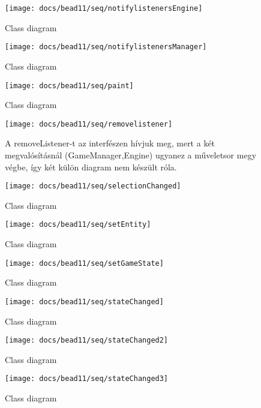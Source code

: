 \documentclass[../../projlab]{subfiles}
\begin{document}
\begin{figure}[H] 
    \centering 
    \texttt{[image: docs/bead11/seq/notifylistenersEngine]} 
    \caption{Class diagram} 
\end{figure} 

\begin{figure}[H] 
    \centering 
    \texttt{[image: docs/bead11/seq/notifylistenersManager]} 
    \caption{Class diagram} 
\end{figure} 

\begin{figure}[H] 
    \centering 
    \texttt{[image: docs/bead11/seq/paint]} 
    \caption{Class diagram} 
\end{figure} 

\begin{figure}[H] 
    \centering 
    \texttt{[image: docs/bead11/seq/removelistener]} 
    \caption{A removeListener-t az interfészen hívjuk meg, mert a két megvalósításnál (GameManager,Engine) ugyanez a műveletsor megy végbe, így két külön diagram nem készült róla.} 
\end{figure}

\begin{figure}[H] 
    \centering 
    \texttt{[image: docs/bead11/seq/selectionChanged]} 
    \caption{Class diagram} 
\end{figure}

\begin{figure}[H] 
    \centering 
    \texttt{[image: docs/bead11/seq/setEntity]} 
    \caption{Class diagram} 
\end{figure} 

\begin{figure}[H] 
    \centering 
    \texttt{[image: docs/bead11/seq/setGameState]} 
    \caption{Class diagram} 
\end{figure} 

\begin{figure}[H] 
    \centering 
    \texttt{[image: docs/bead11/seq/stateChanged]} 
    \caption{Class diagram} 
\end{figure}

\begin{figure}[H] 
    \centering 
    \texttt{[image: docs/bead11/seq/stateChanged2]} 
    \caption{Class diagram} 
\end{figure}

\begin{figure}[H] 
    \centering 
    \texttt{[image: docs/bead11/seq/stateChanged3]} 
    \caption{Class diagram} 
\end{figure}
\end{document}
